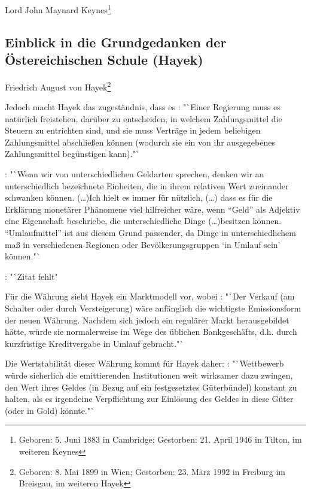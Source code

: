 \documentclass[
        onecolumn,
        a4paper,
        abstracton,
        parskip=half
        ,final
        ]{scrartcl}
\begin{document}
Lord John Maynard Keynes\footnote[14]{Geboren:  5. Juni 1883 in Cambridge; Gestorben: 21. April 1946 in Tilton, im weiteren Keynes}


\subsection{Einblick in die Grundgedanken der {\"O}stereichischen Schule (Hayek)}


Friedrich August von Hayek\footnote[15]{Geboren: 8. Mai 1899 in Wien; Gestorben: 23. M{\"a}rz 1992 in Freiburg im Breisgau, im weiteren Hayek}

Jedoch macht Hayek das zugest{\"a}ndnis, dass es \citep[vgl.][S.23]{Hayek1977}: "`Einer Regierung muss es nat{\"u}rlich freistehen, dar{\"u}ber zu entscheiden, in welchem Zahlungsmittel die Steuern zu entrichten sind, und sie muss Vertr{\"a}ge in jedem beliebigen Zahlungsmittel abschlie{\ss}en k{\"o}nnen (wodurch sie ein von ihr ausgegebenes Zahlungsmittel beg{\"u}nstigen kann)."`

\citep[vgl.][S.40f]{Hayek1977}: "`Wenn wir von unterschiedlichen Geldarten sprechen, denken wir an unterschiedlich bezeichnete Einheiten, die in ihrem relativen Wert zueinander schwanken k{\"o}nnen. (\ldots)Ich hielt es immer f{\"u}r n{\"u}tzlich, (\ldots) dass es f{\"u}r die Erkl{\"a}rung monet{\"a}rer Ph{\"a}nomene viel hilfreicher w{\"a}re, wenn "`Geld"' als Adjektiv eine Eigenschaft beschriebe, die unterschiedliche Dinge (\ldots)besitzen k{\"o}nnen. "`Umlaufmittel"' ist aus diesem Grund passender, da Dinge in unterschiedlichem ma{\ss} in verschiedenen Regionen oder Bev{\"o}lkerungsgruppen `in Umlauf sein' k{\"o}nnen."`

\citep[vgl.][S.43]{Hayek1977}: "`Zitat fehlt"

F{\"u}r die W{\"a}hrung sieht Hayek ein Marktmodell vor, wobei \citep[vgl.][S.31]{Hayek1977}: "`Der Verkauf (am Schalter oder durch Versteigerung) w{\"a}re anf{\"a}nglich die wichtigste Emissionsform der neuen W{\"a}hrung. Nachdem sich jedoch ein regul{\"a}rer Markt herausgebildet h{\"a}tte, w{\"u}rde sie normalerweise im Wege des {\"u}blichen Bankgesch{\"a}fts, d.h. durch kurzfristige Kreditvergabe in Umlauf gebracht."`

Die Wertstabilit{\"a}t dieser W{\"a}hrung kommt f{\"u}r Hayek daher: \citep[vgl.][S.32]{Hayek1977}: "`Wettbewerb w{\"u}rde sicherlich die emittierenden Institutionen weit wirksamer dazu zwingen, den Wert ihres Geldes (in Bezug auf ein festgesetztes G{\"u}terb{\"u}ndel) konstant zu halten, als es irgendeine Verpflichtung zur Einl{\"o}sung des Geldes in diese G{\"u}ter (oder in Gold) k{\"o}nnte."`
\end{document}
